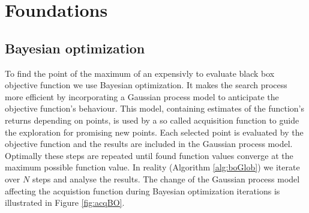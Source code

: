 \chapter{Foundations}
\label{chap:2}

\section{Bayesian optimization}


To find the point of the maximum of an expensivly to evaluate black box objective function we use Bayesian optimization. It makes the search process more efficient by incorporating a Gaussian process model to anticipate the objective function's behaviour. This model, containing estimates of the function's returns depending on points, is used by a so called acquisition function to guide the exploration for promising new points. Each selected point is evaluated by the objective function and the results are included in the Gaussian process model. Optimally these steps are repeated until found function values converge at the maximum possible function value. In reality (Algorithm \ref{alg:boGlob}) we iterate over $N$ steps and analyse the results. The change of the Gaussian process model affecting the acquistion function during Bayesian optimization iterations is illustrated in Figure \ref{fig:acqBO}.\\

